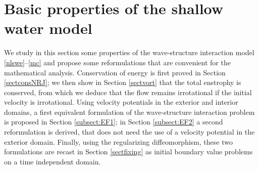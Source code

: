\documentclass[11pt]{article}
\theoremstyle{definition}
\begin{document}
\section{Basic properties of the shallow water model}\label{sect:BP}
We study in this section some properties of the wave-structure interaction model \eqref{nlswe}--\eqref{mc} and
propose some reformulations that are convenient for the mathematical analysis.
Conservation of energy is first proved in Section \ref{sectconsNRJ};
we then show in Section \ref{sectvort} that the total enstrophy is conserved,
from which we deduce that the flow remains irrotational if the initial velocity is irrotational.
Using velocity potentials in the exterior and interior domains,
a first equivalent formulation of the wave-structure interaction problem is proposed in Section \ref{subsect:EF1};
in Section \ref{subsect:EF2} a second reformulation is derived, that does not need the use of a velocity potential in the exterior domain.
Finally, using the regularizing diffeomorphism, these two formulations are recast in Section \ref{sectfixing}
as initial boundary value problems on a time independent domain.
\end{document}
